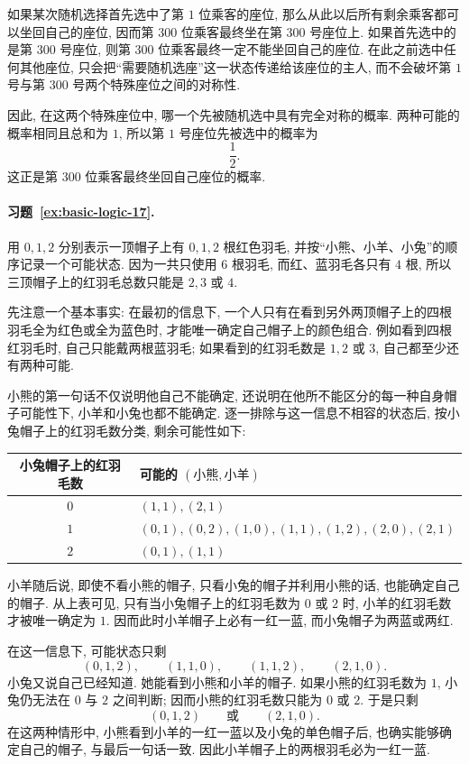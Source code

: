 \documentclass[usesamecnt, thmcnt=section, lang=cn, newtx, 10pt, scheme=chinese]{elegantbook}
\begin{document}
如果某次随机选择首先选中了第 $1$ 位乘客的座位, 那么从此以后所有剩余乘客都可以坐回自己的座位, 因而第 $300$ 位乘客最终坐在第 $300$ 号座位上. 如果首先选中的是第 $300$ 号座位, 则第 $300$ 位乘客最终一定不能坐回自己的座位. 在此之前选中任何其他座位, 只会把``需要随机选座''这一状态传递给该座位的主人, 而不会破坏第 $1$ 号与第 $300$ 号两个特殊座位之间的对称性.

因此, 在这两个特殊座位中, 哪一个先被随机选中具有完全对称的概率. 两种可能的概率相同且总和为 $1$, 所以第 $1$ 号座位先被选中的概率为
\[
 \frac12.
\]
这正是第 $300$ 位乘客最终坐回自己座位的概率.

\paragraph*{习题~\ref{ex:basic-logic-17}.}
用 $0,1,2$ 分别表示一顶帽子上有 $0,1,2$ 根红色羽毛, 并按``小熊、小羊、小兔''的顺序记录一个可能状态. 因为一共只使用 $6$ 根羽毛, 而红、蓝羽毛各只有 $4$ 根, 所以三顶帽子上的红羽毛总数只能是 $2,3$ 或 $4$.

先注意一个基本事实: 在最初的信息下, 一个人只有在看到另外两顶帽子上的四根羽毛全为红色或全为蓝色时, 才能唯一确定自己帽子上的颜色组合. 例如看到四根红羽毛时, 自己只能戴两根蓝羽毛; 如果看到的红羽毛数是 $1,2$ 或 $3$, 自己都至少还有两种可能.

小熊的第一句话不仅说明他自己不能确定, 还说明在他所不能区分的每一种自身帽子可能性下, 小羊和小兔也都不能确定. 逐一排除与这一信息不相容的状态后, 按小兔帽子上的红羽毛数分类, 剩余可能性如下:
\begin{table}[H]
\centering
\begin{tabular}{|c|l|}
\hline
小兔帽子上的红羽毛数 & 可能的 $(\text{小熊},\text{小羊})$\\
\hline
$0$ & $(1,1),(2,1)$\\
$1$ & $(0,1),(0,2),(1,0),(1,1),(1,2),(2,0),(2,1)$\\
$2$ & $(0,1),(1,1)$\\
\hline
\end{tabular}
\end{table}

小羊随后说, 即使不看小熊的帽子, 只看小兔的帽子并利用小熊的话, 也能确定自己的帽子. 从上表可见, 只有当小兔帽子上的红羽毛数为 $0$ 或 $2$ 时, 小羊的红羽毛数才被唯一确定为 $1$. 因而此时小羊帽子上必有一红一蓝, 而小兔帽子为两蓝或两红.

在这一信息下, 可能状态只剩
\[
 (0,1,2),\qquad
 (1,1,0),\qquad
 (1,1,2),\qquad
 (2,1,0).
\]
小兔又说自己已经知道. 她能看到小熊和小羊的帽子. 如果小熊的红羽毛数为 $1$, 小兔仍无法在 $0$ 与 $2$ 之间判断; 因而小熊的红羽毛数只能为 $0$ 或 $2$. 于是只剩
\[
 (0,1,2)
 \qquad\text{或}\qquad
 (2,1,0).
\]
在这两种情形中, 小熊看到小羊的一红一蓝以及小兔的单色帽子后, 也确实能够确定自己的帽子, 与最后一句话一致. 因此小羊帽子上的两根羽毛必为一红一蓝.
\end{document}
